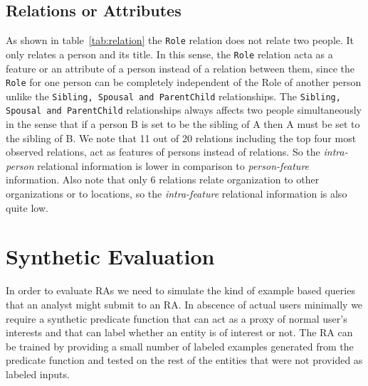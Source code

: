 \documentclass[paper=a4,fontsize=11pt]{scrartcl}
\newcommand{\tabref}[1]{table~\ref{#1}}
\newcommand{\exref}[1]{example~\ref{#1}}
\newcommand{\Todo}[1]{\todo[author=PR,size=\small,inline]{Todo: #1}}
\numberwithin{equation}{section}    %
\numberwithin{figure}{section}      %
\numberwithin{table}{section}       %
\newcommand{\dataset}[0]{\texttt{BBN2} dataset}
\begin{document}
\subsection{Relations or Attributes}
\label{sec:relat-or-attr}
As shown in \tabref{tab:relation} the \texttt{Role} relation does not relate two people.
It only relates a person and its title.
In this sense, the \texttt{Role} relation acta as a feature or an attribute of a person
instead of a relation between them, since the \texttt{Role} for one person can be completely
independent of the Role of another person unlike the \texttt{Sibling, Spousal and ParentChild}
relationships. The \texttt{Sibling, Spousal and ParentChild} relationships always affects two
people simultaneously in the sense that if a person \textsc{B} is set to be the sibling of \textsc{A} then
\textsc{A} must be set to the sibling of \textsc{B}.
We note that 11 out of 20 relations including the top four most observed relations,
act as features of persons instead of relations. So the \textit{intra-person} relational
information is lower in comparison to \textit{person-feature} information.
Also note that only 6 relations relate organization to other organizations or to locations,
so the \textit{intra-feature} relational information is also quite low.


\section{Synthetic Evaluation}
\label{sec:evaluation}
In order to evaluate RAs we need to simulate the kind of example based queries that an analyst might submit to an RA.
In abscence of actual users minimally we require a synthetic predicate function that can act as a proxy of normal user's interests
and that can label whether an entity is of interest or not. The RA can be trained by providing a small number of labeled examples
generated from the predicate function and tested on the rest of the entities that were not provided as labeled inputs.
\end{document}
